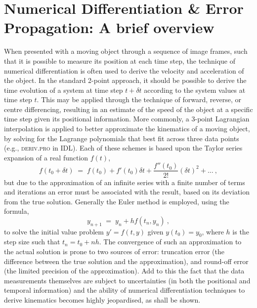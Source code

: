 \documentclass[structabstract]{aa}
\begin{document}
\section{Numerical Differentiation \& Error Propagation: A brief overview}
\label{sect:num_diff_errors}

When presented with a moving object through a sequence of image frames, such that it is possible to measure its position at each time step, the technique of numerical differentiation is often used to derive the velocity and acceleration of the object. In the standard 2-point approach, it should be possible to derive the time evolution of a system at time step $t+\delta t$ according to the system values at time step $t$. This may be applied through the technique of forward, reverse, or centre differencing, resulting in an estimate of the speed of the object at a specific time step given its positional information. More commonly, a 3-point Lagrangian interpolation is applied to better approximate the kinematics of a moving object, by solving for the Lagrange polynomials that best fit across three data points (e.g., \textsc{deriv.pro} in IDL). Each of these schemes is based upon the Taylor series expansion of a real function $f(t)$,
\begin{equation}
\label{taylor1}
f(t_0+\delta t) \; = \; f(t_0)+f'(t_0)\delta t +  \frac{f''(t_0)}{2!}(\delta t)^{2}  + ...\ ,
\end{equation}
but due to the approximation of an infinite series with a finite number of terms and iterations an error must be associated with the result, based on its deviation from the true solution. Generally the Euler method is employed, using the formula,
\begin{equation}
y_{n+1} \; = \; y_n + h f(t_n, y_n)\ ,
\end{equation}
to solve the initial value problem $y'=f(t,y)$ given $y(t_0)=y_0$, where $h$ is the step size such that $t_n=t_0+nh$. The convergence of such an approximation to the actual solution is prone to two sources of error: truncation error (the difference between the true solution and the approximation), and round-off error (the limited precision of the approximation). Add to this the fact that the data measurements themselves are subject to uncertainties (in both the positional and temporal information) and the ability of numerical differentiation techniques to derive kinematics becomes highly jeopardised, as shall be shown.
\end{document}

